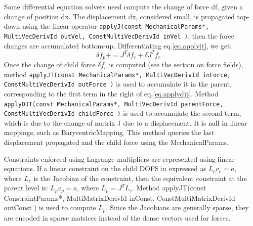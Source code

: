 Some differential equation solvers need compute the change of force df, given a change of position dx.
The displacement dx, considered small, is propagated top-down using the linear operator \texttt{applyJ(const MechanicalParams*, MultiVecDerivId outVel, ConstMultiVecDerivId inVel )}, then the force changes are accumulated bottom-up.
Differentiating eq.\ref{eq.applyjt}, we get:
\begin{equation}
 \label{eq.applydjt}
 \delta f_{p} += J^T \delta f_c + \delta J^T f_c
\end{equation}
Once the change of child force $\delta f_c$ is computed (see the section on force fields), method \texttt{applyJT(const MechanicalParams*, MultiVecDerivId inForce, ConstMultiVecDerivId outForce )} is used to accumulate it in the parent, corresponding to the first term in the right of eq.\ref{eq.applydjt}.
Method \texttt{applyDJT(const MechanicalParams*, MultiVecDerivId parentForce, ConstMultiVecDerivId  childForce )} is used to accumulate the second term, which is due to the change of matrix J due to a displacement.
It is null in linear mappings, such as BarycentricMapping.
This method queries the last displacement propagated and the child force using the MechanicalParams.


Constraints enforced using Lagrange multipliers are represented using linear equations.
If a linear constraint on the child DOFS in expressed as $L_c v_c = a$, where $L_c$ is the Jacobian of the constraint, then the equivalent constraint at the parent level is: $L_p v_p = a$, where $L_p = J^T L_c$.
Method applyJT(const ConstraintParams*, MultiMatrixDerivId inConst, ConstMultiMatrixDerivId outConst ) is used to compute $L_p$.
Since the Jacobians are generally sparse, they are encoded in sparse matrices instead of the dense vectors used for forces.








